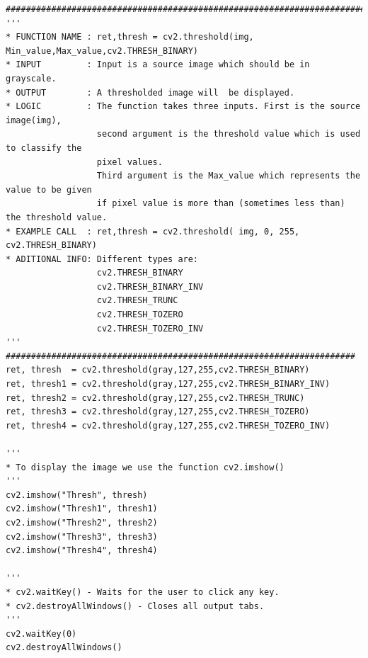 \documentclass[]{article}
\begin{document}
\begin{verbatim}
##########################################################################################
'''
* FUNCTION NAME : ret,thresh = cv2.threshold(img, Min_value,Max_value,cv2.THRESH_BINARY)
* INPUT         : Input is a source image which should be in grayscale.
* OUTPUT        : A thresholded image will  be displayed.
* LOGIC         : The function takes three inputs. First is the source image(img),
                  second argument is the threshold value which is used to classify the 
                  pixel values.
                  Third argument is the Max_value which represents the value to be given 
                  if pixel value is more than (sometimes less than) the threshold value.
* EXAMPLE CALL  : ret,thresh = cv2.threshold( img, 0, 255, cv2.THRESH_BINARY)
* ADITIONAL INFO: Different types are:
                  cv2.THRESH_BINARY
                  cv2.THRESH_BINARY_INV
                  cv2.THRESH_TRUNC
                  cv2.THRESH_TOZERO
                  cv2.THRESH_TOZERO_INV
'''
#####################################################################
ret, thresh  = cv2.threshold(gray,127,255,cv2.THRESH_BINARY)
ret, thresh1 = cv2.threshold(gray,127,255,cv2.THRESH_BINARY_INV)
ret, thresh2 = cv2.threshold(gray,127,255,cv2.THRESH_TRUNC)
ret, thresh3 = cv2.threshold(gray,127,255,cv2.THRESH_TOZERO)
ret, thresh4 = cv2.threshold(gray,127,255,cv2.THRESH_TOZERO_INV)

'''
* To display the image we use the function cv2.imshow()
'''
cv2.imshow("Thresh", thresh)
cv2.imshow("Thresh1", thresh1)
cv2.imshow("Thresh2", thresh2)
cv2.imshow("Thresh3", thresh3)
cv2.imshow("Thresh4", thresh4)

'''
* cv2.waitKey() - Waits for the user to click any key.
* cv2.destroyAllWindows() - Closes all output tabs.
'''
cv2.waitKey(0)
cv2.destroyAllWindows()
\end{verbatim}
\end{document}
